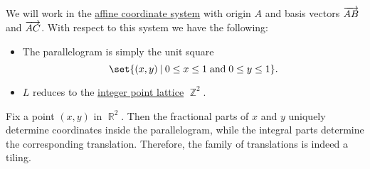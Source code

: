 \begin{defproof}
  We will work in the \hyperref[def:affine_coordinate_system]{affine coordinate system} with origin \( A \) and basis vectors \( \overrightarrow{AB} \) and \( \overrightarrow{AC} \). With respect to this system we have the following:
  \begin{itemize}
    \item The parallelogram is simply the unit square
    \begin{equation*}
      \set{ (x, y) \given 0 \leq x \leq 1 \T{and} 0 \leq y \leq 1 }.
    \end{equation*}

    \item \( L \) reduces to the \hyperref[def:integer_point_lattice]{integer point lattice} \( \BbbZ^2 \).
  \end{itemize}

  Fix a point \( (x, y) \) in \( \BbbR^2 \). Then the fractional parts of \( x \) and \( y \) uniquely determine coordinates inside the parallelogram, while the integral parts determine the corresponding translation. Therefore, the family of translations is indeed a tiling.
\end{defproof}

